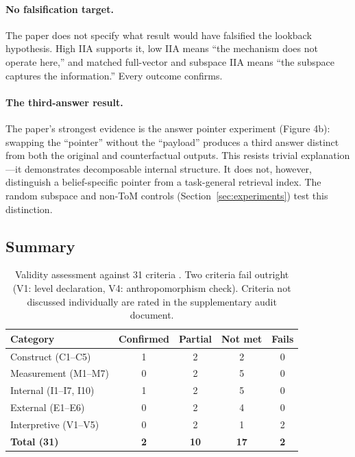 \documentclass[11pt]{article}
\begin{document}
\paragraph{No falsification target.}
The paper does not specify what result would have falsified the lookback hypothesis. High IIA supports it, low IIA means ``the mechanism does not operate here,'' and matched full-vector and subspace IIA means ``the subspace captures the information.'' Every outcome confirms.

\paragraph{The third-answer result.}
The paper's strongest evidence is the answer pointer experiment (Figure 4b): swapping the ``pointer'' without the ``payload'' produces a third answer distinct from both the original and counterfactual outputs. This resists trivial explanation---it demonstrates decomposable internal structure. It does not, however, distinguish a belief-specific pointer from a task-general retrieval index. The random subspace and non-ToM controls (Section~\ref{sec:experiments}) test this distinction.

\subsection{Summary}

\begin{table}[t]
\centering
\caption{Validity assessment against 31 criteria \citep{tower2026mechval}. Two criteria fail outright (V1: level declaration, V4: anthropomorphism check). Criteria not discussed individually are rated in the supplementary audit document.}
\label{tab:validity}
\begin{tabular}{lcccc}
\toprule
Category & Confirmed & Partial & Not met & Fails \\
\midrule
Construct (C1--C5) & 1 & 2 & 2 & 0 \\
Measurement (M1--M7) & 0 & 2 & 5 & 0 \\
Internal (I1--I7, I10) & 1 & 2 & 5 & 0 \\
External (E1--E6) & 0 & 2 & 4 & 0 \\
Interpretive (V1--V5) & 0 & 2 & 1 & 2 \\
\midrule
\textbf{Total (31)} & \textbf{2} & \textbf{10} & \textbf{17} & \textbf{2} \\
\bottomrule
\end{tabular}
\end{table}
\end{document}
